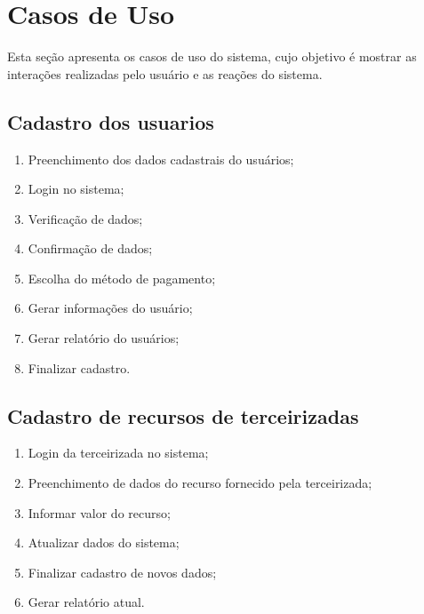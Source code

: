 \section{ Casos de Uso}

Esta seção apresenta os casos de uso do sistema, cujo objetivo é mostrar as interações realizadas pelo usuário e as reações do sistema.

\subsection{Cadastro dos usuarios}
\begin{enumerate}
      \item Preenchimento dos dados cadastrais do usuários;
      \item Login no sistema;

      \item Verificação de dados;
      \item Confirmação de dados;
      \item Escolha do método de pagamento;
      \item Gerar informações do usuário;

      \item Gerar relatório do usuários;
      \item Finalizar cadastro.
\end{enumerate}

\subsection{ Cadastro de recursos de terceirizadas}
\begin{enumerate}
      \item Login da terceirizada no sistema;
      \item Preenchimento de dados do recurso fornecido pela terceirizada;
      \item Informar valor do recurso;
      \item Atualizar dados do sistema;
      \item Finalizar cadastro de novos dados;
      \item Gerar relatório atual.
\end{enumerate}


